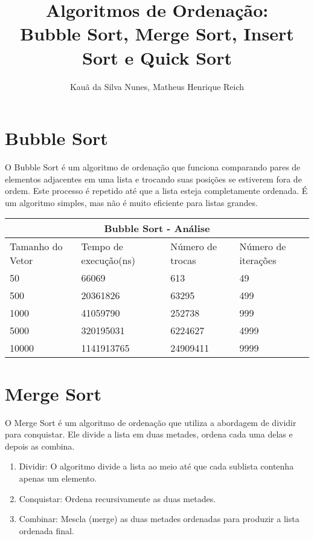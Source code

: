 \documentclass[12pt]{article}
\title{Algoritmos de Ordenação: \\ Bubble Sort, Merge Sort, Insert Sort e Quick Sort}
\author{Kauã da Silva Nunes, Matheus Henrique Reich }
\begin{document}
    \maketitle

    \section{Bubble Sort} \label{sec:firstpage}

    O Bubble Sort é um algoritmo de ordenação que funciona comparando pares de elementos adjacentes em uma lista e trocando suas posições se estiverem fora de ordem. Este processo é repetido até que a lista esteja completamente ordenada. É um algoritmo simples, mas não é muito eficiente para listas grandes.

    \begin{tabular}{ |p{3cm}||p{3cm}|p{3cm}|p{3cm}|  }
        \hline
        \multicolumn{4}{|c|}{Bubble Sort - Análise} \\
        \hline
        Tamanho do Vetor & Tempo de execução(ns) &Número de trocas & Número de iterações\\
        \hline
        50&66069&613&49\\
        500&20361826&63295&499\\
        1000&41059790&252738&999\\
        5000&320195031&6224627&4999\\
        10000&1141913765&24909411&9999\\
        \hline
    \end{tabular}

    \section{Merge Sort}

    O Merge Sort é um algoritmo de ordenação que utiliza a abordagem de dividir para conquistar. Ele divide a lista em duas metades, ordena cada uma delas e depois as combina.
    \begin{enumerate}
        \item Dividir: O algoritmo divide a lista ao meio até que cada sublista contenha apenas um elemento.
        \item Conquistar: Ordena recursivamente as duas metades.
        \item Combinar: Mescla (merge) as duas metades ordenadas para produzir a lista ordenada final.
    \end{enumerate}
\end{document}
